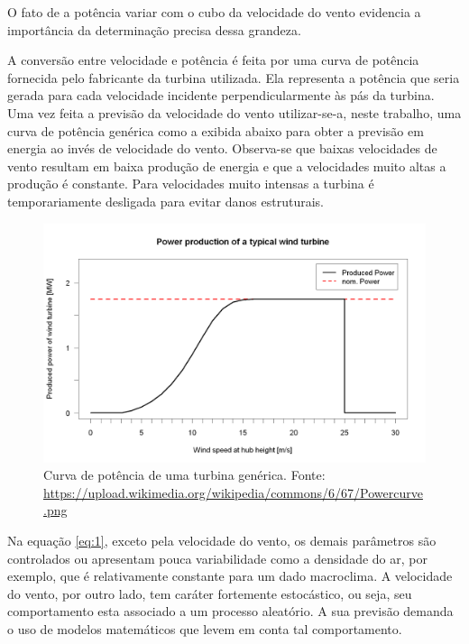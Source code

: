 \documentclass[
	12pt,				%
	openright,			%
	oneside,			%
	a4paper,			%
	english,			%
	french,				%
	spanish,			%
	brazil				%
	]{abntex2}
\begin{document}
O fato de a potência variar com o cubo da velocidade do vento evidencia a importância da determinação precisa dessa grandeza.

A conversão entre velocidade e potência é feita por uma curva de potência fornecida pelo fabricante da turbina utilizada. Ela representa a potência que seria gerada para cada velocidade incidente perpendicularmente às pás da turbina. Uma vez feita a previsão da velocidade do vento utilizar-se-a, neste trabalho, uma curva de potência genérica como a exibida abaixo para obter a previsão em energia ao invés de velocidade do vento. Observa-se que baixas velocidades de vento resultam em baixa produção de energia e que a velocidades muito altas a produção é constante. Para velocidades muito intensas a turbina é temporariamente desligada para evitar danos estruturais.


\begin{figure}[h]
    \centering
	\includegraphics[width=\textwidth]{powercurve}
	\caption{Curva de potência de uma turbina genérica. Fonte: \url{https://upload.wikimedia.org/wikipedia/commons/6/67/Powercurve.png}}
\end{figure}
\FloatBarrier

Na equação \ref{eq:1}, exceto pela velocidade do vento, os demais parâmetros são controlados ou apresentam pouca variabilidade como a densidade do ar, por exemplo, que é relativamente constante para um dado macroclima. A velocidade do vento, por outro lado, tem caráter fortemente estocástico, ou seja, seu comportamento esta associado a um processo aleatório. A sua previsão demanda o uso de modelos matemáticos que levem em conta tal comportamento.
\end{document}
